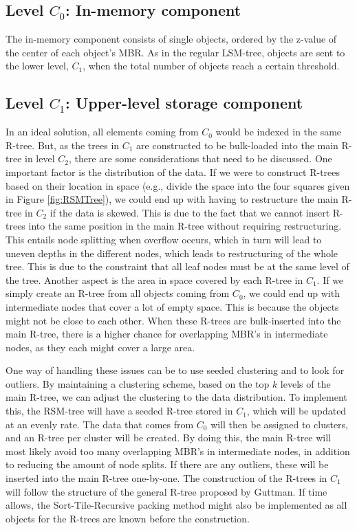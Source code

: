 \subsection{Level $C_0$: In-memory component}
The in-memory component consists of single objects, ordered by the z-value of the center of each object's MBR. As in the regular LSM-tree, objects are sent to the lower level, $C_1$, when the total number of objects reach a certain threshold. 

\subsection{Level $C_1$: Upper-level storage component}
In an ideal solution, all elements coming from $C_0$ would be indexed in the same R-tree. But, as the trees in $C_1$ are constructed to be bulk-loaded into the main R-tree in level $C_2$, there are some considerations that need to be discussed. One important factor is the distribution of the data. If we were to construct R-trees based on their location in space (e.g., divide the space into the four squares given in Figure \ref{fig:RSMTree}), we could end up with having to restructure the main R-tree in $C_2$ if the data is skewed. This is due to the fact that we cannot insert R-trees into the same position in the main R-tree without requiring restructuring. This entails node splitting when overflow occurs, which in turn will lead to uneven depths in the different nodes, which leads to restructuring of the whole tree. This is due to the constraint that all leaf nodes must be at the same level of the tree. Another aspect is the area in space covered by each R-tree in $C_1$. If we simply create an R-tree from all objects coming from $C_0$, we could end up with intermediate nodes that cover a lot of empty space. This is because the objects might not be close to each other. When these R-trees are bulk-inserted into the main R-tree, there is a higher chance for overlapping MBR's in intermediate nodes, as they each might cover a large area. \newline

\noindent
One way of handling these issues can be to use seeded clustering\cite{SeededClustering} and to look for outliers. By maintaining a clustering scheme, based on the top $k$ levels of the main R-tree, we can adjust the clustering to the data distribution. To implement this, the RSM-tree will have a seeded R-tree stored in $C_1$, which will be updated at an evenly rate. The data that comes from $C_0$ will then be assigned to clusters, and an R-tree per cluster will be created. By doing this, the main R-tree will most likely avoid too many overlapping MBR's in intermediate nodes, in addition to reducing the amount of node splits. If there are any outliers, these will be inserted into the main R-tree one-by-one. The construction of the R-trees in $C_1$ will follow the structure of the general R-tree proposed by Guttman\cite{r-tree}. If time allows, the Sort-Tile-Recursive packing method\cite{STR} might also be implemented as all objects for the R-trees are known before the construction.

